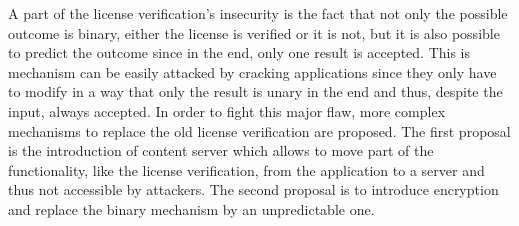 A part of the license verification's insecurity is the fact that not only the possible outcome is binary, either the license is verified or it is not, but it is also possible to predict the outcome since in the end, only one result is accepted.
This is mechanism can be easily attacked by cracking applications since they only have to modify in a way that only the result is unary in the end and thus, despite the input, always accepted.
\newline
In order to fight this major flaw, more complex mechanisms to replace the old license verification are proposed.
The first proposal is the introduction of content server which allows to move part of the functionality, like the license verification, from the application to a server and thus not accessible by attackers.
The second proposal is to introduce encryption and replace the binary mechanism by an unpredictable one.
